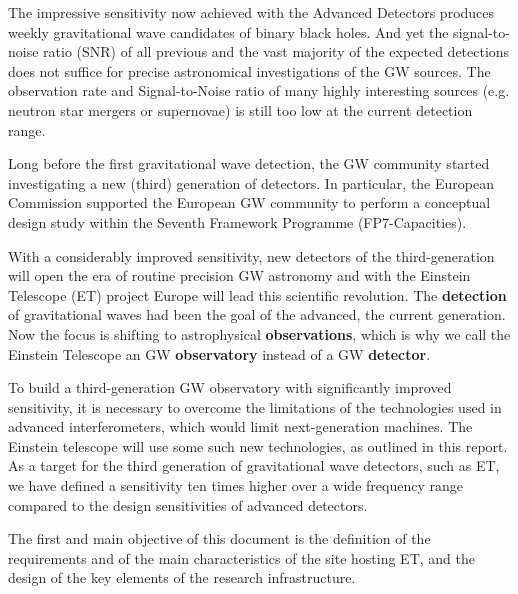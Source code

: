 The impressive sensitivity now achieved with the Advanced Detectors produces weekly gravitational wave candidates of binary black holes. And yet the signal-to-noise ratio (SNR) of all previous and the vast majority of the expected detections does not suffice for precise astronomical investigations of the GW sources. The observation rate and Signal-to-Noise ratio of many highly interesting sources (e.g. neutron star mergers or supernovae) is still too low at the current detection range. \par    
Long before the first gravitational wave detection, the GW community started investigating a new (third) generation of detectors. In particular, the European Commission supported the European GW community to perform a conceptual design study within the Seventh Framework Programme (FP7-Capacities).\par 
With a considerably improved sensitivity, new detectors of the third-generation will open the era of routine precision GW astronomy and with the Einstein Telescope (ET) project Europe will lead this scientific revolution. The \textbf{detection} of gravitational waves had been the goal of the advanced, the current generation. Now the focus is shifting to astrophysical \textbf{observations}, which is why we call the Einstein Telescope an GW \textbf{observatory} instead of a GW \textbf{detector}.\par
To build a third-generation GW observatory with significantly improved sensitivity, it is necessary to overcome the limitations of the technologies used in advanced interferometers, which would limit next-generation machines. The Einstein telescope will use some such new technologies, as outlined in this report.
As a target for the third generation of gravitational wave detectors, such as ET, we have defined a sensitivity ten times higher over a wide frequency range compared to the design sensitivities of advanced detectors.\par
The first and main objective of this document is the definition of  the requirements and of the main characteristics of the site hosting ET, and the design of the key elements of the research infrastructure.

